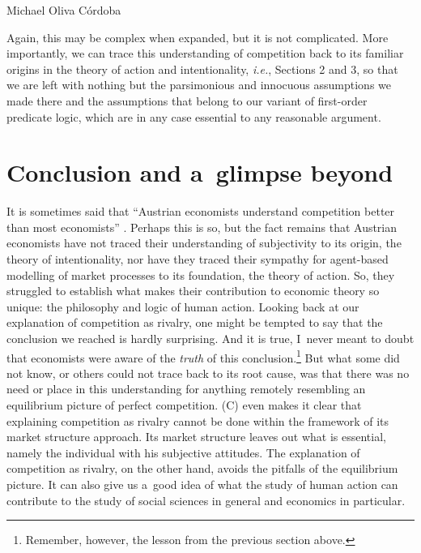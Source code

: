 \begin{artengenv}{Michael Oliva Córdoba}
%
%
%
%

\noindent Again, this may be complex when expanded, but it is not complicated. More importantly, we can trace this understanding of competition back to its familiar origins in the theory of action and intentionality, \textit{i.e.}, Sections 2 and 3, so that we are left with nothing but the parsimonious and innocuous assumptions we made there and the assumptions that belong to our variant of first-order predicate logic, which are in any case essential to any reasonable argument.



\section{Conclusion and a~glimpse beyond}

It is sometimes said that ``Austrian economists understand competition better than most economists'' 
\parencite[][p.142]{nell_competition_2010}. %
 Perhaps this is so, but the fact remains that Austrian economists have not traced their understanding of subjectivity to its origin, the theory of intentionality, nor have they traced their sympathy for agent-based modelling of market processes to its foundation, the theory of action. So, they struggled to establish what makes their contribution to economic theory so unique: the philosophy and logic of human action. Looking back at our explanation of competition as rivalry, one might be tempted to say that the conclusion we reached is hardly surprising. And it is true, I~never meant to doubt that economists were aware of the \textit{truth} of this conclusion.\footnote{Remember, however, the lesson from the previous section above.} But what some did not know, or others could not trace back to its root cause, was that there was no need or place in this understanding for anything remotely resembling an equilibrium picture of perfect competition. (C) even makes it clear that explaining competition as rivalry cannot be done within the framework of its market structure approach. Its market structure leaves out what is essential, namely the individual with his subjective attitudes. The explanation of competition as rivalry, on the other hand, avoids the pitfalls of the equilibrium picture. It can also give us a~good idea of what the study of human action can contribute to the study of social sciences in general and economics in particular.




\end{artengenv}
